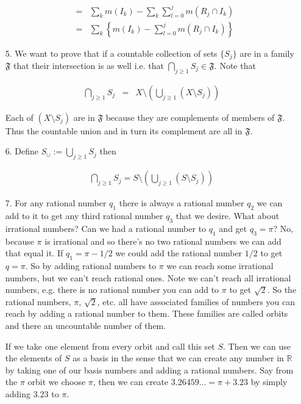 \documentclass[oneside]{book}
\begin{document}
\begin{enumerate}
\begin{eqnarray}
&=& \sum_k m(I_k) -\sum_k \sum_{l=0}^j  m(R_j \cap I_k)\nonumber \\
&=&  \sum_k \left\{ m(I_k) -\sum_{l=0}^j  m(R_j \cap I_k) \right\}
\end{eqnarray}



\item[5.] We want to prove that if a countable collection of sets $\{S_j\}$ are in a family $\mathfrak{F}$ that their intersection is as well i.e. that $\bigcap_{j \ge 1} S_j \in \mathfrak{F}$. Note that

\begin{eqnarray}
\bigcap_{j \ge 1} S_j &=& X \setminus \left( \bigcup_{j \ge 1} (X \setminus S_j) \right)
\end{eqnarray}

Each of $(X \setminus S_j)$ are in $\mathfrak{F}$ because they are complements of members of $\mathfrak{F}$. Thus the countable union and in turn its complement are all in $\mathfrak{F}$.

\item[6.] Define $S_{\cup} := \bigcup_{j \ge 1} S_j$ then

\begin{eqnarray}
\bigcap_{j \ge 1} S_j = S \setminus \left( \bigcup_{j \ge 1} (S \setminus S_j) \right)
\end{eqnarray}

\item[7.] For any rational number $q_1$ there is always a rational number $q_2$ we can add to it to get any third rational number $q_3$ that we desire. What about irrational numbers? Can we had a rational number to $q_1$ and get $q_3 = \pi$? No, because $\pi$ is irrational and so there's no two rational numbers we can add that equal it. If $q_1=\pi-1/2$ we could add the rational number $1/2$ to get $q=\pi$. So by adding rational numbers to $\pi$ we can reach some irrational numbers, but we can't reach rational ones. Note we can't reach all irrational numbers, e.g. there is no rational number you can add to $\pi$ to get $\sqrt{2}$. So the rational numbers, $\pi$, $\sqrt{2}$, etc. all have associated families of numbers you can reach by adding a rational number to them. These families are called orbits and there an uncountable number of them.

If we take one element from every orbit and call this set $S$. Then we can use the elements of $S$ as a basis in the sense that we can create any number in $\mathbb{R}$ by taking one of our basis numbers and adding a rational numbers. Say from the $\pi$ orbit we choose $\pi$, then we can create $3.26459...=\pi+3.23$ by simply adding $3.23$ to $\pi$.  


\end{enumerate}
\end{document}
